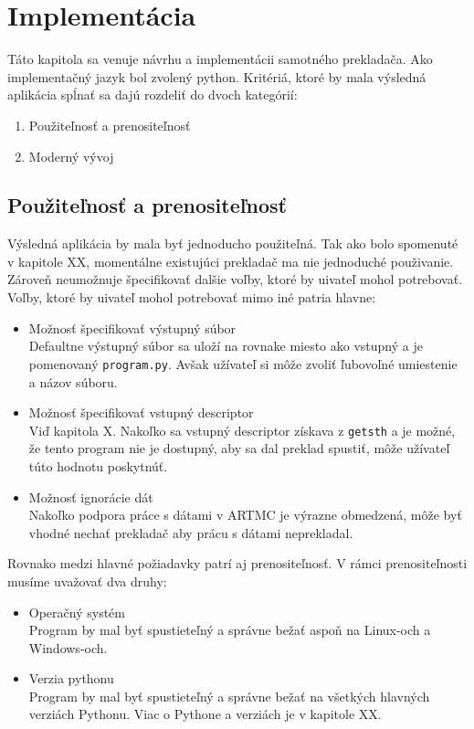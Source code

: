 \chapter{Implementácia}
Táto kapitola sa venuje návrhu a implementácii samotného prekladača.
Ako implementačný jazyk bol zvolený python. Kritériá, ktoré by mala výsledná
aplikácia spĺnať sa dajú rozdeliť do dvoch kategórií:
\begin{enumerate}
    \item Použiteľnosť a prenositeľnosť
    \item Moderný vývoj
\end{enumerate}

\section{Použiteľnosť a prenositeľnosť}
Výsledná aplikácia by mala byť jednoducho použiteľná. Tak ako bolo spomenuté v
kapitole XX, momentálne existujúci prekladač ma nie jednoduché použivanie. Zároveň
neumožnuje špecifikovať dalšie voľby, ktoré by uivateľ mohol potrebovať. Voľby,
ktoré by uivateľ mohol potrebovať mimo iné patria hlavne:
\begin{itemize}
    \item Možnosť špecifikovať výstupný súbor\\
        Defaultne výstupný súbor sa uloží na rovnake miesto ako vstupný a je
        pomenovaný \texttt{program.py}. Avšak užívateľ si môže zvoliť ľubovoľné umiestenie
        a názov súboru.
    \item Možnosť špecifikovať vstupný descriptor\\
        Viď kapitola X. Nakoľko sa vstupný descriptor získava z \texttt{getsth} a je
        možné, že tento program nie je dostupný, aby sa dal preklad spustiť, môže
        užívateľ túto hodnotu poskytnúť.
    \item Možnosť ignorácie dát\\
        Nakoľko podpora práce s dátami v ARTMC je výrazne obmedzená, môže byť
        vhodné nechať prekladač aby prácu s dátami neprekladal.
\end{itemize}

Rovnako medzi hlavné požiadavky patrí aj prenositeľnosť. V rámci prenositeľnosti
musíme uvažovať dva druhy:
\begin{itemize}
    \item Operačný systém\\
        Program by mal byť spustieteľný a správne bežať aspoň na Linux-och a Windows-och.
    \item Verzia pythonu\\
        Program by mal byť spustieteľný a správne bežať na všetkých hlavných verziách Pythonu.
        Viac o Pythone a verziách je v kapitole XX.
\end{itemize}

